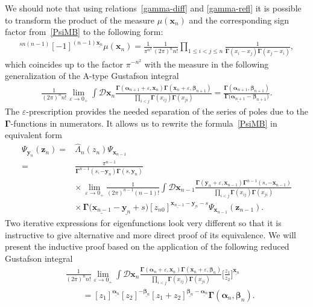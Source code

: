 \documentclass[pdftex]{sigma}
\numberwithin{equation}{section}
\begin{document}
We should note that using relations~\eqref{gamma-diff} and
\eqref{gamma-refl} it is possible to transform the
product of the measure $\mu(\bm{x}_{n})$ and the corresponding
sign factor from~\eqref{PsiMB} to the following form:
\begin{align*}
[-1]^{sn(n-1)} [-1]^{(n-1)\underline{\bm{x}_{n}}}
\mu(\bm{x}_{n}) = \frac{1}{\pi^{n^2}}
\frac{1}{(2\pi)^n n!}
\prod\limits_{1\leq i<j\leq n}
\frac{1}{\mathbf{\Gamma}(x_i-x_j)\mathbf{\Gamma}(x_j-x_i)},
\end{align*}
which coincides up to the factor $\pi^{-n^2}$ with the measure in the following generalization \cite{DM,DM3,DMV2,DMV1,MN,N,SS0,SS1,SS2} of the A-type Gustafson integral \cite{G2,G1,G3}
\begin{align*}
\frac{1}{(2\pi)^n n!}
\lim\limits_{\varepsilon\to 0_+}
\int \mathcal{D}\bm{x}_{n}
\frac{\mathbf{\Gamma}(\bm \alpha_{n+1}+\varepsilon,\bm x_{n})
\mathbf{\Gamma}(\bm x_{n}+\varepsilon,\bm \beta_{n+1})}
{\prod\limits_{i<j}
\mathbf{\Gamma}(x_{ij})\mathbf{\Gamma}(x_{ji})} =
\frac{\mathbf{\Gamma}(\bm \alpha_{n+1},\bm \beta_{n+1})}
{\mathbf{\Gamma}\bigl(\underline{\bm \alpha_{n+1}}-\underline{\bm \beta_{n+1}}\bigr)} .
\end{align*}
The $\varepsilon$-prescription provides the needed separation of the series
of poles due to the $\mathbf{\Gamma}$-functions in numerators.
It allows us to rewrite the formula~\eqref{PsiMB} in equivalent form
\begin{align*}
\Psi_{\bm{y}_{n}}(\bm{z}_{n}) ={}& \hat{\Lambda}_n(z_n) \Psi_{\bm{x}_{n-1}} \\
={}&
\frac{\pi^{n-1}}{\mathbf{\Gamma}^{n-1}(s ,-\bm{y}_{n})
\mathbf{\Gamma}(s ,\bm{y}_{n})} \\
&{\times}\,
\lim\limits_{\varepsilon\to 0_+} \frac{1}{(2\pi)^{n-1} (n-1)!}
\int \mathcal{D}\bm{x}_{n-1}
\frac{\mathbf{\Gamma}(\bm y_{n}+\varepsilon,\bm x_{n-1})
\mathbf{\Gamma}^{n-1}(s ,-\bm{x}_{n-1})}
{\prod\limits_{i<j}\mathbf{\Gamma}(x_{ij})\mathbf{\Gamma}(x_{ji})} \\
&{\times}\,
\mathbf{\Gamma}\bigl(\underline{\bm{x}_{n-1}}-\underline{\bm{y}_{n}}+s\bigr)
[z_{n 0}]^{\underline{\bm{x}_{n-1}}-\underline{\bm{y}_{n}}-s}
\Psi_{\bm{x}_{n-1}}(\bm{z}_{n-1}) .
\end{align*}
Two iterative expressions for eigenfunctions look very different
so that it is instructive to give alternative and more direct proof of its equivalence.
We will present the inductive proof based on the application
of the following reduced Gustafson integral \cite{M}
\begin{align}
& \nonumber
\frac{1}{(2\pi)^n n!}
\lim\limits_{\varepsilon\to 0_+}
\int \mathcal{D}\bm{x}_{n}
\frac{\mathbf{\Gamma}(\bm \alpha_{n}+\varepsilon,\bm x_{n})
\mathbf{\Gamma}(\bm x_{n}+\varepsilon,\bm \beta_{n})}
{\prod\limits_{i<j}
\mathbf{\Gamma}(x_{ij})\mathbf{\Gamma}(x_{ji})}
\biggl[\frac{z_1}{z_2}\biggr]^{\underline{\bm x_{n}}} \\
\label{gus1}
& \qquad =
[z_1]^{\underline{\bm \alpha_{n}}} [z_2]^{-\underline{\bm \beta_{n}}}
[z_1+z_2]^{\underline{\bm \beta_{n}}-\underline{\bm \alpha_{n}}}
\mathbf{\Gamma}(\bm \alpha_{n},\bm \beta_{n}) .
\end{align}
\end{document}
